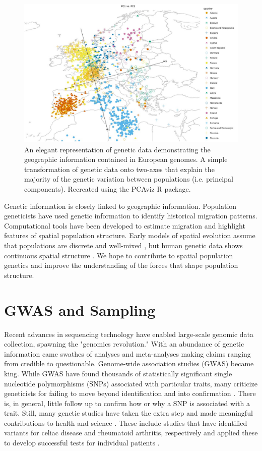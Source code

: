 \begin{figure}[h]
    \centering
    \includegraphics[scale = 0.45]{img/novembre_pca.JPG}
    \caption{An elegant representation of genetic data demonstrating the geographic information contained in European genomes. A simple transformation of genetic data onto two-axes that explain the majority of the genetic variation between populations (i.e. principal components). Recreated using the PCAviz R package. \cite{pcaviz}}
    \label{fig:novembre_pca}
\end{figure}

Genetic information is closely linked to geographic information. Population geneticists have used genetic information to identify historical migration patterns. Computational tools have been developed to estimate migration and highlight features of spatial population structure. \cite{petkova_2016} Early models of spatial evolution assume that populations are discrete and well-mixed \cite{wakeley_2009} \cite{Kingman_1982}, but human genetic data shows continuous spatial structure \cite{novembre_stephens_2008}. We hope to contribute to spatial population genetics and improve the understanding of the forces that shape population structure.


\section{GWAS and Sampling}
Recent advances in sequencing technology have enabled large-scale genomic data collection, spawning the "genomics revolution." With an abundance of genetic information came swathes of analyses and meta-analyses making claims ranging from credible to questionable.\cite{ganna_2019} Genome-wide association studies (GWAS) became king. While GWAS have found thousands of statistically significant single nucleotide polymorphisms (SNPs) associated with particular traits, many criticize geneticists for failing to move beyond identification and into confirmation \cite{visscher_2012}. There is, in general, little follow up to confirm how or why a SNP is associated with a trait. Still, many genetic studies have taken the extra step and made meaningful contributions to health and science \cite{belbin_2017}. These include studies that have identified variants for celiac disease and rheumatoid arthritis, respectively and applied these to develop successful tests for individual patients \cite{abraham_2014} \cite{han_2014}. 


